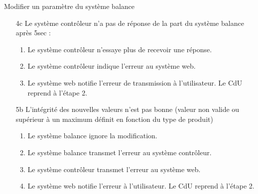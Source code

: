 \begin{UseCase}{Modifier un paramètre du système balance}
\begin{UseCaseExtension}
\begin{enumerate}
            \begin{enumerate}
                \item Le système contrôleur notifie l'erreur de transmission au
                    système web.
                \item Le système web transmet l'erreur à l'utilisateur. Le CdU
                    reprend à l'étape 2.
            \end{enumerate}
        \item[4c] Le système contrôleur n'a pas de réponse de la part du
            système balance après 5sec :
            \begin{enumerate}
                \item Le système contrôleur n'essaye plus de recevoir une
                    réponse.
                \item Le système contrôleur indique l'erreur au système web.
                \item Le système web notifie l'erreur de transmission à
                    l'utilisateur. Le CdU reprend à l'étape 2.
            \end{enumerate}
        \item[5b] L'intégrité des nouvelles valeurs n'est pas bonne (valeur non
            valide ou supérieur à un maximum définit en fonction du type de
            produit)
            \begin{enumerate}
                \item Le système balance ignore la modification.
                \item Le système balance transmet l'erreur au système
                    contrôleur.
                \item Le système contrôleur transmet l'erreur au système web.
                \item Le système web notifie l'erreur à l'utilisateur. Le CdU
                    reprend à l'étape 2.
            \end{enumerate}
    \end{enumerate}
\end{UseCaseExtension}

\end{UseCase}
